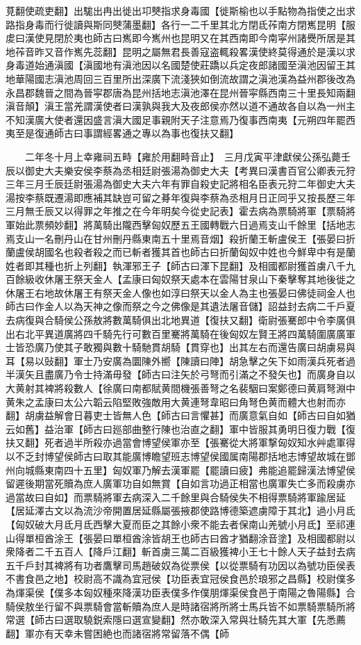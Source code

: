 莧翻使疏吏翻】出駹出冉出徙出卭僰指求身毒國【徙斯榆也以手點物為指使之出求路指身毒而行徙讀與斯同僰蒲墨翻】各行一二千里其北方閉氐莋南方閉嶲昆明【服䖍曰漢使見閉於夷也師古曰嶲即今嶲州也昆明又在其西南即今南寜州諸㸑所居是其地莋音昨又音作嶲先蕊翻】昆明之屬無君長善寇盗輒殺畧漢使終莫得通於是漢以求身毒道始通滇國【滇國地有滇池因以名國楚使莊蹻以兵定夜郎諸國至滇池因留王其地華陽國志滇池周回三百里所出深廣下流淺狹如倒流故謂之滇池漢為益州郡後改為永昌郡魏晉之間為晉寜郡唐為昆州括地志滇池澤在昆州晉寜縣西南三十里長知兩翻滇音顛】滇王當羌謂漢使者曰漢孰與我大及夜郎侯亦然以道不通故各自以為一州主不知漢廣大使者還因盛言滇大國足事親附天子注意焉乃復事西南夷【元朔四年罷西夷至是復通師古曰事謂經畧通之專以為事也復扶又翻】

　　二年冬十月上幸雍祠五畤【雍於用翻畤音止】　三月戊寅平津獻侯公孫弘薨壬辰以御史大夫樂安侯李蔡為丞相廷尉張湯為御史大夫【考異曰漢書百官公卿表元狩三年三月壬辰廷尉張湯為御史大夫六年有罪自殺史記將相名臣表元狩二年御史大夫湯按李蔡既遷湯即應補其缺豈可留之朞年復與李蔡為丞相月日正同乎又按長歷三年三月無壬辰又以得罪之年推之在今年明矣今從史記表】霍去病為票騎將軍【票騎將軍始此票頻妙翻】將萬騎出隴西擊匈奴歷五王國轉戰六日過焉支山千餘里【括地志焉支山一名刪丹山在甘州刪丹縣東南五十里焉音烟】殺折蘭王斬盧侯王【張晏曰折蘭盧侯胡國名也殺者殺之而已斬者獲其首也師古曰折蘭匈奴中姓也今鮮卑中有是蘭姓者即其種也折上列翻】執渾邪王子【師古曰渾下昆翻】及相國都尉獲首虜八千九百餘級收休屠王祭天金人【孟康曰匈奴祭天處本在雲陽甘泉山下秦擊奪其地後徙之休屠王右地故休屠王有祭天金人像也如淳曰祭天以金人為主也張晏曰佛徒祠金人也師古曰作金人以為天神之像而祭之今之佛像是其遺法屠音儲】詔益封去病二千戶夏去病復與合騎侯公孫敖將數萬騎俱出北地異道【復扶又翻】衛尉張騫郎中令李廣俱出右北平異道廣將四千騎先行可數百里騫將萬騎在後匈奴左賢王將四萬騎圍廣廣軍士皆恐廣乃使其子敢獨與數十騎馳貫胡騎【貫穿也】出其左右而還告廣曰胡虜易與耳【易以䜴翻】軍士乃安廣為圜陳外嚮【陳讀曰陣】胡急擊之矢下如雨漢兵死者過半漢矢且盡廣乃令士持滿毋發【師古曰注矢於弓弩而引滿之不發矢也】而廣身自以大黄射其裨將殺數人【徐廣曰南都賦黄間機張善弩之名裴駰曰案鄭德曰黄肩弩淵中黄朱之孟康曰太公六韜云陷堅敗強敵用大黄連弩韋昭曰角弩色黄而體大也射而亦翻】胡虜益解會日暮吏士皆無人色【師古曰言懼甚】而廣意氣自如【師古曰自如猶云如舊】益治軍【師古曰廵部曲整行陳也治直之翻】軍中皆服其勇明日復力戰【復扶又翻】死者過半所殺亦過當會博望侯軍亦至【張騫從大將軍撃匈奴知水艸處軍得以不乏封博望侯師古曰取其能廣博瞻望班志博望侯國属南陽郡括地志博望故城在鄧州向城縣東南四十五里】匈奴軍乃解去漢軍罷【罷讀曰疲】弗能追罷歸漢法博望侯留遲後期當死贖為庶人廣軍功自如無賞【自如言功過正相當也廣軍失亡多而殺虜亦過當故曰自如】而票騎將軍去病深入二千餘里與合騎侯失不相得票騎將軍踰居延【居延澤古文以為流沙帝開置居延縣屬張掖郡使路博德築遮虜障于其北】過小月氐【匈奴破大月氐月氐西擊大夏而臣之其餘小衆不能去者保南山羌號小月氐】至祁連山得單桓酋涂王【張晏曰單桓酋涂皆胡王也師古曰酋才猶翻涂音塗】及相國都尉以衆降者二千五百人【降戶江翻】斬首虜三萬二百級獲裨小王七十餘人天子益封去病五千戶封其裨將有功者鷹擊司馬趙破奴為從票侯【以從票騎有功因以為號功臣侯表不書食邑之地】校尉高不識為宜冠侯【功臣表宜冠侯食邑於琅邪之昌縣】校尉僕多為煇渠侯【僕多本匈奴種來降漢功臣表僕多作僕朋煇渠侯食邑于南陽之魯陽縣】合騎侯敖坐行留不與票騎會當斬贖為庶人是時諸宿將所將士馬兵皆不如票騎票騎所將常選【師古曰選取驍鋭索隱曰選宣變翻】然亦敢深入常與壮騎先其大軍【先悉薦翻】軍亦有天幸未嘗困絶也而諸宿將常留落不偶【師